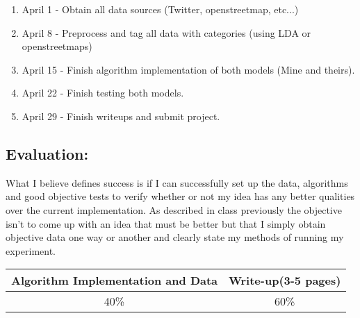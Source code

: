 \documentclass[11pt]{article}
\begin{document}
\begin{enumerate}
	\item April 1 - Obtain all data sources (Twitter, openstreetmap, etc...)
	\item April 8 - Preprocess and tag all data with categories (using LDA or openstreetmaps)
	\item April 15 - Finish algorithm implementation of both models (Mine and theirs).
	\item April 22 - Finish testing both models.
	\item April 29 - Finish writeups and submit project.
\end{enumerate}

\subsection{Evaluation: }
What I believe defines success is if I can successfully set up the data, algorithms and good objective tests to verify whether or not my idea has any better qualities over the current implementation. As described in class previously the objective isn't to come up with an idea that must be better but that I simply obtain objective data one way or another and clearly state my methods of running my experiment.
\begin{center}
\begin{tabular}{ |c|c| } 
 \hline
Algorithm Implementation and Data&Write-up(3-5 pages)\\ \hline
40\%&60\%\\ 
 \hline
\end{tabular}
\end{center}
\end{document}
